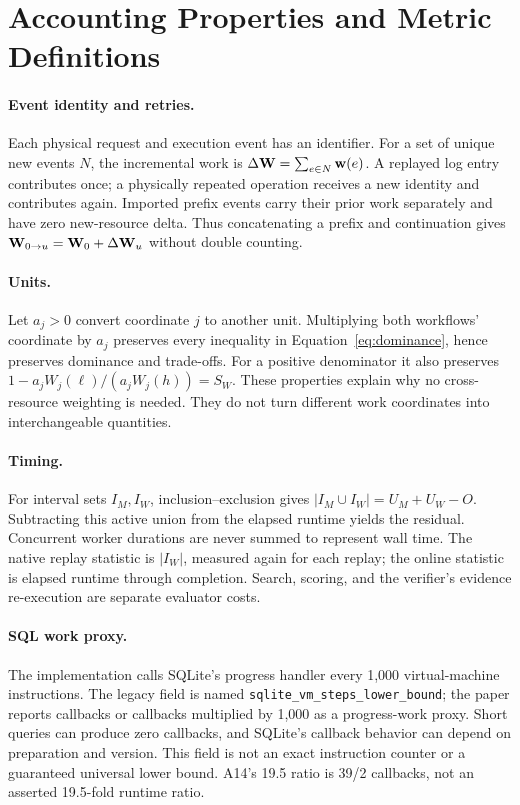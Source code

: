 \section{Accounting Properties and Metric Definitions}
\label{app:properties}
\paragraph{Event identity and retries.}
Each physical request and execution event has an identifier. For a set of unique new events $N$, the incremental work is $\Delta\mathbf{W}=\sum_{e\in N}\mathbf{w}(e)$. A replayed log entry contributes once; a physically repeated operation receives a new identity and contributes again. Imported prefix events carry their prior work separately and have zero new-resource delta. Thus concatenating a prefix and continuation gives $\mathbf{W}_{0\rightarrow u}=\mathbf{W}_0+\Delta\mathbf{W}_u$ without double counting.

\paragraph{Units.}
Let $a_j>0$ convert coordinate $j$ to another unit. Multiplying both workflows' coordinate by $a_j$ preserves every inequality in Equation~\ref{eq:dominance}, hence preserves dominance and trade-offs. For a positive denominator it also preserves $1-a_jW_j(\ell)/(a_jW_j(h))=S_W$. These properties explain why no cross-resource weighting is needed. They do not turn different work coordinates into interchangeable quantities.

\paragraph{Timing.}
For interval sets $I_M,I_W$, inclusion--exclusion gives $|I_M\cup I_W|=U_M+U_W-O$. Subtracting this active union from the elapsed runtime yields the residual. Concurrent worker durations are never summed to represent wall time. The native replay statistic is $|I_W|$, measured again for each replay; the online statistic is elapsed runtime through completion. Search, scoring, and the verifier's evidence re-execution are separate evaluator costs.

\paragraph{SQL work proxy.}
The implementation calls SQLite's progress handler every 1,000 virtual-machine instructions. The legacy field is named \nolinkurl{sqlite_vm_steps_lower_bound}; the paper reports callbacks or callbacks multiplied by 1,000 as a progress-work proxy. Short queries can produce zero callbacks, and SQLite's callback behavior can depend on preparation and version. This field is not an exact instruction counter or a guaranteed universal lower bound. A14's 19.5 ratio is 39/2 callbacks, not an asserted 19.5-fold runtime ratio.

